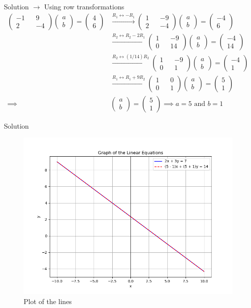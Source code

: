\documentclass{beamer}
\numberwithin{equation}{section}
\theoremstyle{remark}
\newcommand{\myvec}[1]{\ensuremath{\begin{pmatrix}#1\end{pmatrix}}}
\begin{document}
\begin{frame}{Solution}
$\rightarrow$ Using row transformations
\begin{align}
    \myvec{-1&&9\\2&&-4}\myvec{a\\b} = \myvec{4\\6} &\xrightarrow{R_1 \leftrightarrow -R_1} \myvec{1&&-9\\2&&-4}\myvec{a\\b} = \myvec{-4\\6} \\
    &\xrightarrow{R_2 \leftrightarrow R_2 - 2R_1} \myvec{1&&-9\\0&&14}\myvec{a\\b} = \myvec{-4\\14} \\
    &\xrightarrow{R_2 \leftrightarrow (1/14)R_2} \myvec{1&&-9\\0&&1}\myvec{a\\b} = \myvec{-4\\1} \\
    &\xrightarrow{R_1 \leftrightarrow R_1 + 9R_2} \myvec{1&&0\\0&&1}\myvec{a\\b} = \myvec{5\\1} \\
    \implies &\myvec{a\\b} = \myvec{5\\1} \implies a = 5 \text{ and } b = 1
\end{align}
\end{frame}

\begin{frame}{Solution}
\begin{figure}[h!]
   \centering
   \includegraphics[width=0.8\linewidth]{figs/01.png}
   \caption{Plot of the lines}
   \label{Plot_1}
\end{figure}
\end{frame}
\end{document}
